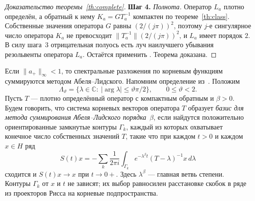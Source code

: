 \documentclass[12pt,a4paper]{article}
\theoremstyle{definition}
\newcommand{\step}[1]{\smallskip\noindent\textbf{Шаг #1.}}
\renewcommand{\C}{\mathbb C}
\newcommand{\norm}[1]{\lVert#1\rVert}
\newcommand{\abs}[1]{\lvert#1\rvert}
\begin{document}
\begin{proof}[Доказательство теоремы~\ref{th:complete}]
\step{4} \emph{Полнота.} Оператор $L_a$ плотно определён, а обратный к нему
$K_a=GT_a^{-1}$ компактен по теореме~\ref{th:class}. Собственные значения оператора $G$
равны $(2/(j\pi))^2$, поэтому $j$-е сингулярное число оператора $K_a$ не превосходит
$\norm{T_a^{-1}}(2/(j\pi))^2$, и $L_a$ имеет порядок $2$. В силу шага~3 отрицательная
полуось есть луч наилучшего убывания резольвенты оператора $L_a$. Остаётся применить
\cite[теорема~4.7]{Shk}. Теорема доказана.
\end{proof}

Если $\norm{a_+}_\infty<1$, то спектральные разложения по корневым функциям суммируются
методом Абеля--Лидского. Напомним определение из~\cite[\S5]{Shk}. Положим
\[
 \Lambda_\vartheta=\{\lambda\in\C:\ \abs{\arg\lambda}\le\vartheta\pi/2\},\qquad
 0\le\vartheta<2 .
\]
Пусть $T$ --- плотно определённый оператор с компактным обратным и $\beta>0$. Будем
говорить, что система корневых векторов оператора $T$ образует \emph{базис для метода
суммирования Абеля--Лидского порядка~$\beta$}, если найдутся положительно ориентированные
замкнутые контуры $\Gamma_k$, каждый из которых охватывает конечное число собственных
значений $T$, такие что при каждом $t>0$ и каждом $x\in H$ ряд
\[
 S(t)x=-\sum_k\frac1{2\pi i}\int_{\Gamma_k}e^{-\lambda^\beta t}(T-\lambda)^{-1}x\,d\lambda
\]
сходится и $S(t)x\to x$ при $t\to0+$. Здесь $\lambda^\beta$ --- главная ветвь степени.
Контуры $\Gamma_k$ от $x$ и $t$ не зависят; их выбор равносилен расстановке скобок в ряде
из проекторов Рисса на корневые подпространства.
\end{document}
